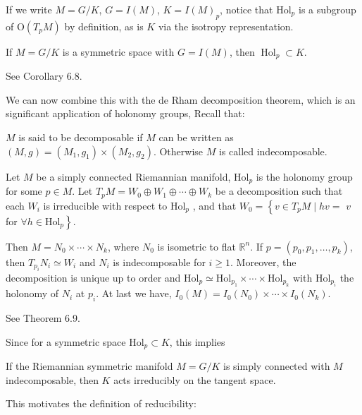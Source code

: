 If we write $M = G / K$, $G = I(M)$, $K = I(M)_p$,  notice that
$\mathrm{Hol}_{p}$ is a subgroup of $\mathrm{O}\left(T_{p}
M\right)$ by definition, as is $K$ via the isotropy
representation.

\begin{corollary}
	If $M = G / K$ is a symmetric space with $G = {I}(M)$, then
	$\operatorname{Hol}_{p} \subset K$.
\end{corollary}
\bproof
See \cite{Ziller} Corollary 6.8.
\eproof


We can now combine this  with the de Rham decomposition theorem,
which is an significant application of holonomy groups, 
Recall that:
\begin{definition}
	$M$ is said to be decomposable if $M$ can be written as
	$(M,g) = (M_1,g_1)\times(M_2,g_2)$. Otherwise $M$ is called
	indecomposable.
\end{definition}
\begin{theorem}[de Rham]
	 Let $M$ be a simply connected Riemannian manifold,
	 $\mathrm{Hol}_{p}$ is the holonomy group for some $p\in M$.
	 Let $T_{p} M = W_{0} \oplus W_{1} \oplus \cdots \oplus
	 W_{k}$ be a decomposition such that each $W_i$ is
	 irreducible with respect to $\mathrm{Hol}_{p}$ , and that 
	 $W_{0} = \left\{ v \in T_{p} M \mid h v = \right.$ $v$ for
	 $\forall \left.h \in \mathrm{Hol}_{p} \right\}$. 
	 
	 Then $M = N_{0} \times \cdots \times N_{k}$, where $N_{0}$
	 is isometric to flat $\mathbb{R}^{n}$. If $p = \left(p_{0},
	 p_{1}, \ldots, p_{k} \right)$, then $T_{p_{i}} N_{i} \simeq
	 W_{i}$ and $N_{i}$ is indecomposable for $i \geq 1$.
	 Moreover, the decomposition is unique up to order and
	 $\mathrm{Hol}_{p} \simeq \mathrm{Hol}_{p_{1}} \times \cdots
	 \times \mathrm{Hol}_{p_{k}}$ with $\mathrm{Hol}_{p_{i}}$ the holonomy
	of $N_{i}$ at $p_{i} .$ At last we have, ${I}_{0}(M) = {I}_{0}\left(N_{0}\right) \times \cdots \times {I}_{0}\left(N_{k}\right)$.
\end{theorem}
\bproof
See \cite{Ziller} Theorem 6.9.
\eproof

Since for a symmetric space Hol$_{p} \subset K$, this implies 

\begin{corollary}
	If the Riemannian symmetric manifold $M = G / K$ is simply
	connected with $M$ indecomposable, then $K$ acts irreducibly
	on the tangent space.
\end{corollary}

This motivates the definition of reducibility:


